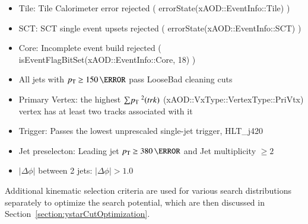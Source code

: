 \begin{itemize}
\item Tile: Tile Calorimeter error rejected ( errorState(xAOD::EventInfo::Tile) )
\item SCT: SCT single event upsets rejected ( errorState(xAOD::EventInfo::SCT) )
\item Core: Incomplete event build rejected ( isEventFlagBitSet(xAOD::EventInfo::Core, 18) )
\item All jets with $\pt\ge 150\,\GeV$ pass LooseBad cleaning cuts
\item Primary Vertex: the highest $\sum\pt^{2}(trk)$ (xAOD::VxType::VertexType::PriVtx) vertex has at least two tracks associated with it
\item Trigger: Passes the lowest unprescaled single-jet trigger, HLT\_j420
\item Jet preselecton: Leading jet $\pt\ge 380\,\GeV$ and Jet multiplicity $\ge 2$
\item $|\Delta\phi|$ between 2 jets: $|\Delta\phi| > 1.0$
\end{itemize}

Additional kinematic selection criteria are used for various search distributions separately to optimize the
search potential, which are then discussed in Section~\ref{section:ystarCutOptimization}.



